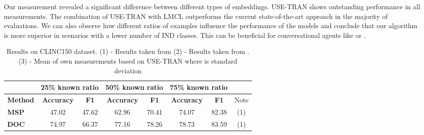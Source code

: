 \documentclass[runningheads]{llncs}
\begin{document}
Our measurement revealed a significant difference between different types of embeddings. USE-TRAN shows outstanding performance in all measurements. The combination of USE-TRAN with LMCL outperforms the current state-of-the-art approach in the majority of evaluations. We can also observe how different ratios of examples influence the performance of the models and conclude that our algorithm is more superior in scenarios with a lower number of IND classes. This can be beneficial for conversational agents like \cite{finch2020emora} or \cite{pichl2020alquist}.

\begin{table}[t]
\caption{Results on CLINC150 dataset. (1) - Results taken from \cite{zhang2021adaptive_decision_boundary} (2) - Results taken from \cite{odist}. (3) - Mean of own measurements based on USE-TRAN where  is standard deviation}
\label{tab:clinc_result}
\centering
\begin{adjustbox}{width=1\textwidth}
\begin{tabular}{l|cc|cc|cc|c}
                            & \multicolumn{2}{c|}{25\% known ratio}                                                                                          & \multicolumn{2}{c|}{50\% known ratio}                                                                                          & \multicolumn{2}{c|}{75\% known ratio}                                                                                          &      \\ \hline
\textbf{Method}             & \multicolumn{1}{c}{\textbf{Accuracy}} & \multicolumn{1}{c|}{\textbf{F1}} & \multicolumn{1}{c}{\textbf{Accuracy}} & \multicolumn{1}{c|}{\textbf{F1}} & \multicolumn{1}{c}{\textbf{Accuracy}} & \multicolumn{1}{c|}{\textbf{F1}} & Note \\ \hline
\textbf{MSP}                & 47.02                                 & 47.62                                                                                  & 62.96                                 & 70.41                                                                                  & 74.07                                 & 82.38                                                                                  & (1)  \\
\textbf{DOC}                & 74.97                                 & 66.37                                                                                  & 77.16                                 & 78.26                                                                                  & 78.73                                 & 83.59                                                                                  & (1)  \\

\end{tabular}
\end{adjustbox}
\end{table}
\end{document}
